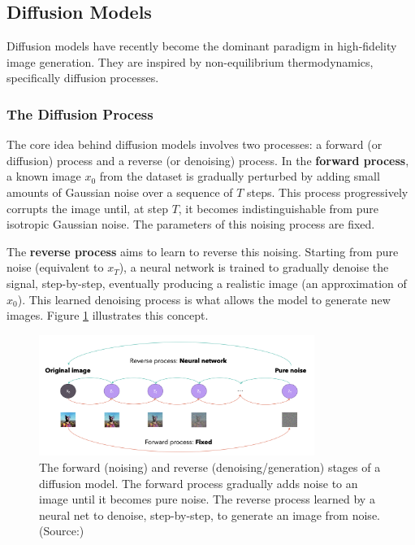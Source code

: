 \subsection{Diffusion Models}
Diffusion models have recently become the dominant paradigm in high-fidelity image generation. They are inspired by non-equilibrium thermodynamics, specifically diffusion processes.

\subsubsection{The Diffusion Process}
The core idea behind diffusion models involves two processes: a forward (or diffusion) process and a reverse (or denoising) process.
In the \textbf{forward process}, a known image $x_0$ from the dataset is gradually perturbed by adding small amounts of Gaussian noise over a sequence of $T$ steps. This process progressively corrupts the image until, at step $T$, it becomes indistinguishable from pure isotropic Gaussian noise. The parameters of this noising process are fixed.

The \textbf{reverse process} aims to learn to reverse this noising. Starting from pure noise (equivalent to $x_T$), a neural network is trained to gradually denoise the signal, step-by-step, eventually producing a realistic image (an approximation of $x_0$). This learned denoising process is what allows the model to generate new images. Figure \ref{fig:diffusion-process} illustrates this concept.

\begin{figure}[h]
  \centering
  \includegraphics[width=0.8\textwidth]{images/related-work/diffusion-process.png}
  \caption{The forward (noising) and reverse (denoising/generation) stages of a diffusion model. The forward process gradually adds noise to an image until it becomes pure noise. The reverse process learned by a neural net to denoise, step-by-step, to generate an image from noise. (Source:\cite{diffusion_process})}
  \label{fig:diffusion-process}
\end{figure}


